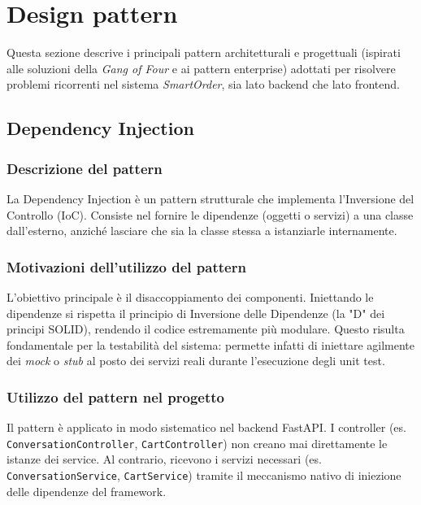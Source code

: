 \documentclass[a4paper, 11pt, oneside]{scrartcl}
\begin{document}

\newpage
\section{Design pattern}

Questa sezione descrive i principali pattern architetturali e progettuali (ispirati alle soluzioni della \textit{Gang of Four} e ai pattern enterprise) adottati per risolvere problemi ricorrenti nel sistema \textit{SmartOrder}, sia lato backend che lato frontend.

\subsection{Dependency Injection}

\subsubsection{Descrizione del pattern}
La Dependency Injection è un pattern strutturale che implementa l'Inversione del Controllo (IoC). Consiste nel fornire le dipendenze (oggetti o servizi) a una classe dall'esterno, anziché lasciare che sia la classe stessa a istanziarle internamente.

\subsubsection{Motivazioni dell'utilizzo del pattern}
L'obiettivo principale è il disaccoppiamento dei componenti. Iniettando le dipendenze si rispetta il principio di Inversione delle Dipendenze (la "D" dei principi SOLID), rendendo il codice estremamente più modulare. Questo risulta fondamentale per la testabilità del sistema: permette infatti di iniettare agilmente dei \textit{mock} o \textit{stub} al posto dei servizi reali durante l'esecuzione degli unit test.

\subsubsection{Utilizzo del pattern nel progetto}
Il pattern è applicato in modo sistematico nel backend FastAPI. I controller (es. \texttt{ConversationController}, \texttt{CartController}) non creano mai direttamente le istanze dei service. Al contrario, ricevono i servizi necessari (es. \texttt{ConversationService}, \texttt{CartService}) tramite il meccanismo nativo di iniezione delle dipendenze del framework.
\end{document}
